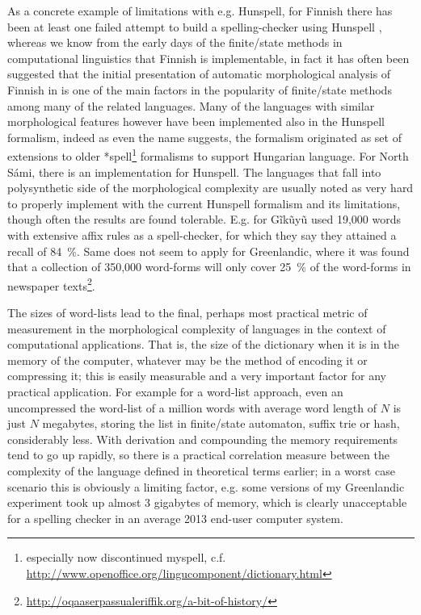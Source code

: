 \documentclass[officiallayout]{unihelcompling}
\begin{document}
As a concrete example of limitations with e.g. Hunspell, for Finnish there has
been at least one failed attempt to build a spelling-checker using Hunspell
\citep{pitkanen2006hunspell}, whereas we know from the early days of the
finite\-/state methods in computational linguistics that Finnish is
implementable, in fact it has often been suggested that the initial
presentation of automatic morphological analysis of Finnish in
\citet{koskenniemi1983twolevel} is one of the main factors in the popularity of
finite\-/state methods among many of the related languages. Many of the
languages with similar morphological features however have been implemented
also in the Hunspell formalism, indeed as even the name suggests, the formalism
originated as set of extensions to older *spell\footnote{especially now
discontinued myspell, c.f.
\url{http://www.openoffice.org/lingucomponent/dictionary.html}} formalisms to
support Hungarian language.  For North Sámi, there is an implementation for
Hunspell. The languages that fall into polysynthetic side of the morphological
complexity are usually noted as very hard to properly implement with the
current Hunspell formalism and its limitations, though often the results are
found tolerable. E.g. for Gĩkũyũ \citet{chege2010developing} used 19,000 words
with extensive affix rules as a spell-checker, for which they say they attained
a recall of 84~\%. Same does not seem to apply for Greenlandic, where it was
found that a collection of 350,000 word-forms will only cover 25~\% of the
word-forms in newspaper
texts\footnote{\url{http://oqaaserpassualeriffik.org/a-bit-of-history/}}.

The sizes of word-lists lead to the final, perhaps most practical metric of
measurement in the morphological complexity of languages in the context of
computational applications. That is, the size of the dictionary when it is in
the memory of the computer, whatever may be the method of encoding it or
compressing it; this is easily measurable and a very important factor for any
practical application.  For example for a word-list approach, even an
uncompressed the word-list of a million words with average word length of $N$
is just $N$ megabytes, storing the list in finite\-/state automaton, suffix trie
or hash, considerably less. With derivation and compounding the memory
requirements tend to go up rapidly, so there is a practical correlation measure
between the complexity of the language defined in theoretical terms earlier; in
a worst case scenario this is obviously a limiting factor, e.g. some versions
of my Greenlandic experiment took up almost 3 gigabytes of memory, which is
clearly unacceptable for a spelling checker in an average 2013 end-user
computer system.
\end{document}
